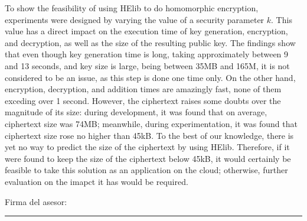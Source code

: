 To show the feasibility of using HElib to do homomorphic encryption, experiments were designed by varying the value of a security parameter $k$. This value has a direct impact on the execution time of key generation, encryption, and decryption, as well as the size of the resulting public key. The findings show that even though key generation time is long, taking approximately between 9 and 13 seconds, and key size is large, being between 35MB and 165M, it is not considered to be an issue, as this step is done one time only. On the other hand, encryption, decryption, and addition times are amazingly fast, none of them exceding over 1 second. However, the ciphertext raises some doubts over the magnitude of its size: during development, it was found that on average, ciphertext size was 74MB; meanwhile, during experimentation, it was found that ciphertext size rose no higher than 45kB. To the best of our knowledge, there is yet no way to predict the size of the ciphertext by using HElib. Therefore, if it were found to keep the size of the ciphertext below 45kB, it would certainly be feasible to take this solution as an application on the cloud; otherwise, further evaluation on the imapct it has would be required.

\noindent Firma del asesor: \rule{72mm}{0.3pt}

\vspace*{-4mm}

\noindent \phantom{Firma del asesor: m} \asesor
